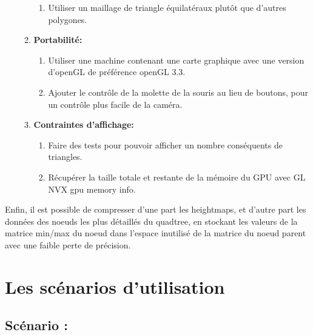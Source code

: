 \documentclass[12pt]{report}
\begin{document}
\begin{enumerate}
\begin{enumerate}
\begin{enumerate}
                \item Utiliser un maillage de triangle équilatéraux plutôt que d'autres polygones.
            \end{enumerate}
        \item \textbf{Portabilité:}
        \begin{enumerate}
            \item Utiliser une machine contenant une carte graphique avec une version d'openGL de préférence openGL 3.3.
            \item Ajouter le contrôle de la molette de la souris au lieu de boutons, pour un contrôle plus facile de la caméra.
        \end{enumerate}
        \item \textbf{Contraintes d'affichage:}
        \begin{enumerate}
            \item Faire des tests pour pouvoir afficher un nombre conséquents de triangles.
            \item Récupérer la taille totale et restante de la mémoire du GPU avec GL NVX gpu memory info.
        \end{enumerate}
    \end{enumerate}
\end{enumerate}

Enfin, il est possible de compresser d'une part les heightmaps, et d'autre part les données des noeuds les plus détaillés du quadtree, en stockant les valeurs de la matrice min/max du noeud dans l'espace inutilisé de la matrice du noeud parent avec une faible perte de précision.

\chapter{Les scénarios d'utilisation}
\section{Scénario :}
\end{document}
